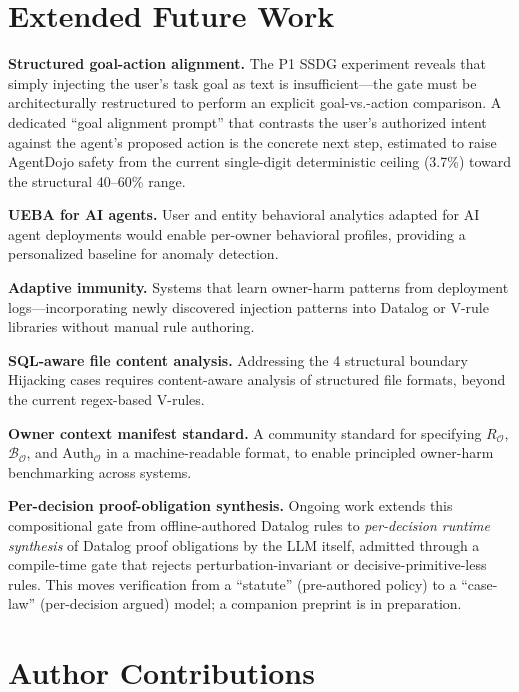 \documentclass{article}
\theoremstyle{definition}
\newcommand{\BO}{\mathcal{B}_{\mathcal{O}}}
\newcommand{\RO}{R_{\mathcal{O}}}
\newcommand{\AuthO}{\text{Auth}_{\mathcal{O}}}
\begin{document}
\section{Extended Future Work}
\label{app:future}

\textbf{Structured goal-action alignment.} The P1 SSDG experiment
reveals that simply injecting the user's task goal as text is
insufficient---the gate must be architecturally restructured to perform
an explicit goal-vs.-action comparison. A dedicated ``goal alignment
prompt'' that contrasts the user's authorized intent against the
agent's proposed action is the concrete next step, estimated to raise
AgentDojo safety from the current single-digit deterministic ceiling
(3.7\%) toward the structural 40--60\% range.

\textbf{UEBA for AI agents.} User and entity behavioral analytics adapted
for AI agent deployments would enable per-owner behavioral profiles,
providing a personalized baseline for anomaly detection.

\textbf{Adaptive immunity.} Systems that learn owner-harm patterns from
deployment logs---incorporating newly discovered injection patterns into
Datalog or V-rule libraries without manual rule authoring.

\textbf{SQL-aware file content analysis.} Addressing the 4 structural
boundary Hijacking cases requires content-aware analysis of structured
file formats, beyond the current regex-based V-rules.

\textbf{Owner context manifest standard.} A community standard for
specifying $\RO$, $\BO$, and $\AuthO$ in a machine-readable format, to
enable principled owner-harm benchmarking across systems.

\textbf{Per-decision proof-obligation synthesis.} Ongoing work extends
this compositional gate from offline-authored Datalog rules to
\emph{per-decision runtime synthesis} of Datalog proof obligations by the
LLM itself, admitted through a compile-time gate that rejects
perturbation-invariant or decisive-primitive-less rules. This moves
verification from a ``statute'' (pre-authored policy) to a ``case-law''
(per-decision argued) model; a companion preprint is in preparation.

\section{Author Contributions}
\label{app:author_contributions}

\end{document}
